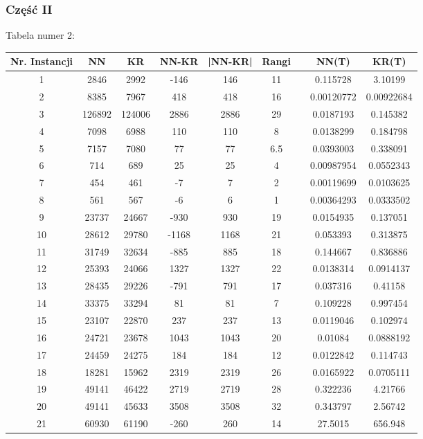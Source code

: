 \documentclass{article}
\begin{document}
\subsubsection{Część II}
Tabela numer 2:
\begin{table}[h!]
\centering
\begin{tabular}{c||c|c||c|c||c c c|c}
Nr. Instancji & NN & KR & NN-KR & |NN-KR| & Rangi & & NN(T) & KR(T)\\
\hline
1 & 2846 & 2992 & -146 & 146 & 11 &  & 0.115728 & 3.10199 \\
2 & 8385 & 7967 & 418 & 418 & 16 &  & 0.00120772 & 0.00922684 \\
3 & 126892 & 124006 & 2886 & 2886 & 29 &  & 0.0187193 & 0.145382 \\
4 & 7098 & 6988 & 110 & 110 & 8 &  & 0.0138299 & 0.184798 \\
5 & 7157 & 7080 & 77 & 77 & 6.5 &  & 0.0393003 & 0.338091 \\
6 & 714 & 689 & 25 & 25 & 4 &  & 0.00987954 & 0.0552343 \\
7 & 454 & 461 & -7 & 7 & 2 &  & 0.00119699 & 0.0103625 \\
8 & 561 & 567 & -6 & 6 & 1 &  & 0.00364293 & 0.0333502 \\
9 & 23737 & 24667 & -930 & 930 & 19 &  & 0.0154935 & 0.137051 \\
10 & 28612 & 29780 & -1168 & 1168 & 21 &  & 0.053393 & 0.313875 \\
11 & 31749 & 32634 & -885 & 885 & 18 &  & 0.144667 & 0.836886 \\
12 & 25393 & 24066 & 1327 & 1327 & 22 &  & 0.0138314 & 0.0914137 \\
13 & 28435 & 29226 & -791 & 791 & 17 &  & 0.037316 & 0.41158 \\
14 & 33375 & 33294 & 81 & 81 & 7 &  & 0.109228 & 0.997454 \\
15 & 23107 & 22870 & 237 & 237 & 13 &  & 0.0119046 & 0.102974 \\
16 & 24721 & 23678 & 1043 & 1043 & 20 &  & 0.01084 & 0.0888192 \\
17 & 24459 & 24275 & 184 & 184 & 12 &  & 0.0122842 & 0.114743 \\
18 & 18281 & 15962 & 2319 & 2319 & 26 &  & 0.0165922 & 0.0705111 \\
19 & 49141 & 46422 & 2719 & 2719 & 28 &  & 0.322236 & 4.21766 \\
20 & 49141 & 45633 & 3508 & 3508 & 32 &  & 0.343797 & 2.56742 \\
21 & 60930 & 61190 & -260 & 260 & 14 &  & 27.5015 & 656.948 \\

\end{tabular}
\end{table}
\end{document}
